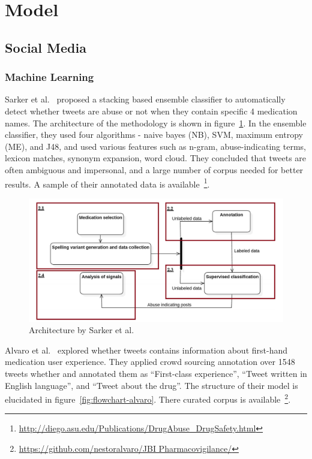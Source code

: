 \section{Model}

\subsection{Social Media}

\subsubsection{Machine Learning}

Sarker et al.~\cite{sarker2016social} proposed a stacking based ensemble classifier to automatically detect whether tweets are abuse or not when they contain specific 4 medication names. The architecture of the methodology is shown in figure~\ref{fig:model-sarker}. In the ensemble classifier, they used four algorithms - naive bayes (NB), SVM, maximum entropy (ME), and J48, and used various features such as n-gram, abuse-indicating terms, lexicon matches, synonym expansion, word cloud. They concluded that tweets are often ambiguous and impersonal, and a large number of corpus needed for better results. A sample of their annotated data is available~\footnote{\url{http://diego.asu.edu/Publications/DrugAbuse_DrugSafety.html}}. 

\begin{figure}[h]
	\centering
	\includegraphics[width=0.99\linewidth]{Figures/h.png}
	\caption{Architecture by Sarker et al.~\cite{sarker2016social}}
	\label{fig:model-sarker}
\end{figure}

Alvaro et al.~\cite{alvaro2015crowdsourcing} explored whether tweets contains information about first-hand medication user experience. They applied crowd sourcing annotation over 1548 tweets whether and annotated them as “First-class experience”, “Tweet written in English language”, and “Tweet about the drug”. The structure of their model is elucidated in figure~\ref{fig:flowchart-alvaro}. There curated corpus is available~\footnote{\url{https://github.com/nestoralvaro/JBI Pharmacovigilance/}}.


